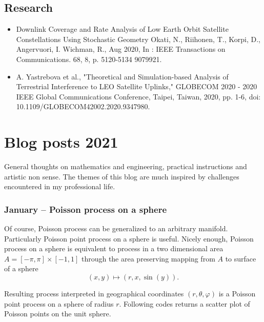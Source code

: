 \documentclass{article}
\begin{document}
\subsection{Research}

\begin{itemize}
\item Downlink Coverage and Rate Analysis of Low Earth Orbit Satellite Constellations Using Stochastic Geometry
  Okati, N., Riihonen, T., Korpi, D., Angervuori, I. Wichman, R., Aug 2020, In : IEEE Transactions on Communications. 68, 8, p. 5120-5134 9079921.\\
\item A. Yastrebova et al., "Theoretical and Simulation-based Analysis of Terrestrial Interference to LEO Satellite Uplinks," GLOBECOM 2020 - 2020 IEEE Global Communications Conference, Taipei, Taiwan, 2020, pp. 1-6, doi: 10.1109/GLOBECOM42002.2020.9347980.
\end{itemize}


\section{Blog posts 2021}
General thoughts on mathematics and engineering, practical instructions and artistic non sense. The themes of this blog are much inspired by challenges encountered in my professional life.

\subsubsection{January – Poisson process on a sphere}
Of course, Poisson process can be generalized to an arbitrary manifold. Particularly Poisson point process on a sphere is useful. Nicely enough, Poisson process on a sphere is equivalent to process in a two dimensional area $ A = [-\pi,\pi] \times [-1,1]$ through the area preserving mapping from $A$ to surface of a sphere
\begin{equation}
  (x,y) \mapsto (r,x,\sin(y)) \nonumber.
\end{equation}


Resulting process interpreted in geographical coordinates $(r,\theta,\varphi)$ is a Poisson point process on a sphere of radius $r$.  Following codes returns a scatter plot of Poisson points on the unit sphere.
\end{document}
